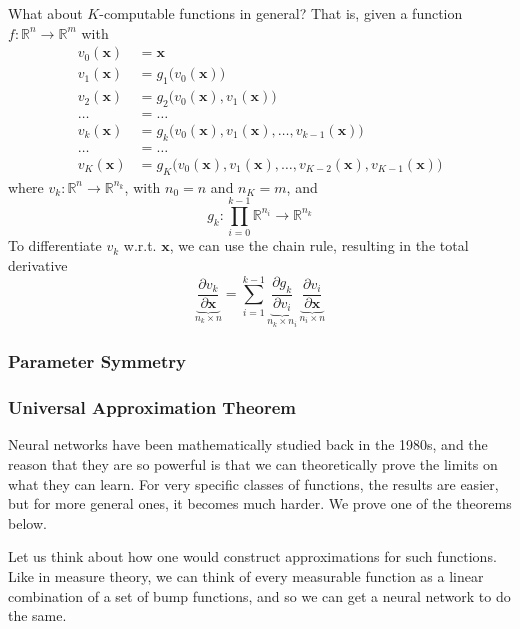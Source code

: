 \documentclass{article}
\begin{document}
       What about $K$-computable functions in general? That is, given a function $f: \mathbb{R}^n \longrightarrow \mathbb{R}^m$ with 
       \begin{align*}
           v_0 (\mathbf{x}) & = \mathbf{x} \\ 
           v_1 (\mathbf{x}) & = g_1 \big(v_0(\mathbf{x}) \big) \\
           v_2 (\mathbf{x}) & = g_2 \big(v_0(\mathbf{x}), v_1 (\mathbf{x}) \big) \\ 
           \ldots & = \ldots \\
           v_k (\mathbf{x}) & = g_k \big(v_0 (\mathbf{x}), v_1(\mathbf{x}), \ldots, v_{k-1} (\mathbf{x}) \big) \\
           \ldots & = \ldots \\
           v_K (\mathbf{x}) & = g_K \big(v_0(\mathbf{x}), v_1 (\mathbf{x}), \ldots, v_{K-2}(\mathbf{x}), v_{K-1}(\mathbf{x}) \big)
       \end{align*}
       where $v_k: \mathbb{R}^n \longrightarrow \mathbb{R}^{n_k}$, with $n_0 = n$ and $n_K = m$, and 
       \[g_k : \prod_{i=0}^{k-1} \mathbb{R}^{n_i} \longrightarrow \mathbb{R}^{n_k}\]
       To differentiate $v_k$ w.r.t. $\mathbf{x}$, we can use the chain rule, resulting in the total derivative 
       \[\underbrace{\frac{\partial v_k}{\partial \mathbf{x}}}_{n_k \times n} = \sum_{i=1}^{k-1} \underbrace{\frac{\partial g_k}{\partial v_i}}_{n_k \times n_i} \, \underbrace{\frac{\partial v_i}{\partial \mathbf{x}}}_{n_i \times n}\]

    \subsubsection{Parameter Symmetry}


    \subsubsection{Universal Approximation Theorem} 

    Neural networks have been mathematically studied back in the 1980s, and the reason that they are so powerful is that we can theoretically prove the limits on what they can learn. For very specific classes of functions, the results are easier, but for more general ones, it becomes much harder. We prove one of the theorems below. 

    Let us think about how one would construct approximations for such functions. Like in measure theory, we can think of every measurable function as a linear combination of a set of bump functions, and so we can get a neural network to do the same.
\end{document}
